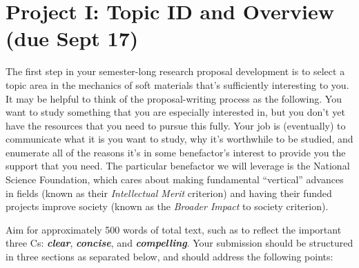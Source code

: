 \section*{Project I: Topic ID and Overview (due Sept 17)}


The first step in your semester-long research proposal development is to select a topic area in the mechanics of soft materials that's sufficiently interesting to you. 
It may be helpful to think of the proposal-writing process as the following. 
You want to study something that you are especially interested in, but you don't yet have the resources that you need to pursue this fully. 
Your job is (eventually) to communicate what it is you want to study, why it's worthwhile to be studied, and enumerate all of the reasons it's in some benefactor's interest to provide you the support that you need.
The particular benefactor we will leverage is the National Science Foundation, which cares about making fundamental ``vertical'' advances in fields (known as their \textit{Intellectual Merit} criterion) and having their funded projects improve society (known as the \textit{Broader Impact} to society criterion). 

Aim for approximately 500 words of total text, such as to reflect the important three Cs: \textbf{\textit{clear}}, \textbf{\textit{concise}}, and \textbf{\textit{compelling}}.
Your submission should be structured in three sections as separated below, and should address the following points: 

